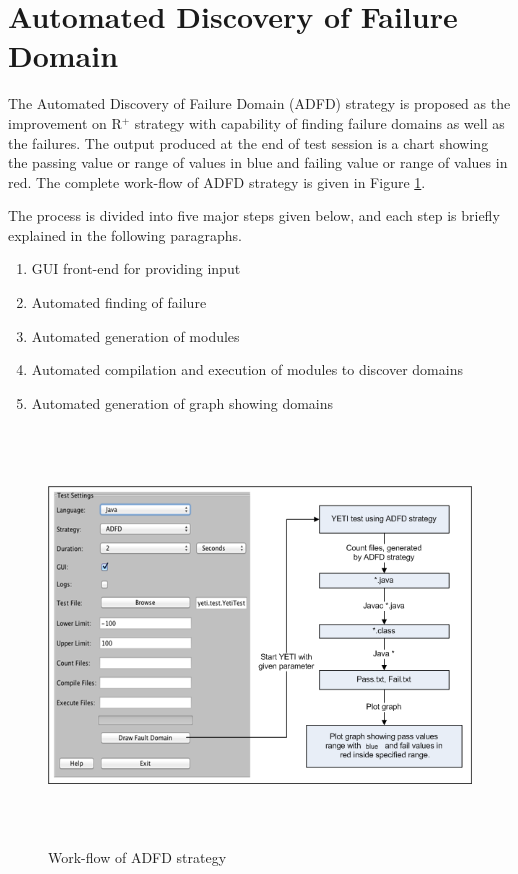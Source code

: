 \section{Automated Discovery of Failure Domain}\label{sec:adfd}

The Automated Discovery of Failure Domain (ADFD) strategy is proposed as the improvement on R$^+$ strategy with capability of finding failure domains as well as the failures. The output produced at the end of test session is a chart showing the passing value or range of values in blue and failing value or range of values in red. The complete work-flow of ADFD strategy is given in Figure \ref{fig:ADFD-workflow}.

The process is divided into five major steps given below, and each step is briefly explained in the following paragraphs.

\begin{enumerate}
\item GUI front-end for providing input
\item Automated finding of failure
\item Automated generation of modules
\item Automated compilation and execution of modules to discover domains
\item Automated generation of graph showing domains
\end{enumerate}

\bigskip
\begin{figure}[ht]
\centering
\includegraphics[width=15cm,height=11cm]{chapter5/ADFD_Diagram1.png}
\bigskip
\caption{Work-flow of ADFD strategy}
\label{fig:ADFD-workflow}
\end{figure}
\bigskip

